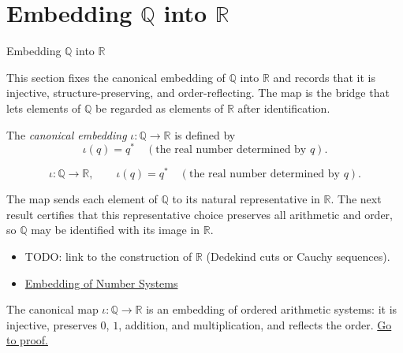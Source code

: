 \section{Embedding $\mathbb{Q}$ into $\mathbb{R}$}
\label{sec:embedding-q-into-r}

\begin{topicbox}{Embedding $\mathbb{Q}$ into $\mathbb{R}$}
\begin{exposition}
This section fixes the canonical embedding of $\mathbb{Q}$ into $\mathbb{R}$ and records that it is injective, structure-preserving, and order-reflecting. The map is the bridge that lets elements of $\mathbb{Q}$ be regarded as elements of $\mathbb{R}$ after identification.
\end{exposition}
\end{topicbox}
\begin{tcolorbox}[colback=defbox, colframe=defborder, arc=2pt,
  left=6pt, right=6pt, top=4pt, bottom=4pt,
  title={\small\textbf{Definition (Embedding $\mathbb{Q}$ into $\mathbb{R}$)}},
  fonttitle=\small\bfseries]
\begin{definition}
\label{def:embedding-q-into-r}
The \emph{canonical embedding} $\iota:\mathbb{Q}\to \mathbb{R}$ is defined by
\[
\iota(q)=q^{*} \quad(\text{the real number determined by } q).
\]
\end{definition}
\end{tcolorbox}
\begin{remark*}
\[
\iota:\mathbb{Q}\to \mathbb{R},\qquad \iota(q)=q^{*} \quad(\text{the real number determined by } q).
\]
\end{remark*}
\begin{remark*}[Interpretation]
The map sends each element of $\mathbb{Q}$ to its natural representative in $\mathbb{R}$. The next result certifies that this representative choice preserves all arithmetic and order, so $\mathbb{Q}$ may be identified with its image in $\mathbb{R}$.
\end{remark*}
\begin{dependencies}
\begin{itemize}
  \item TODO: link to the construction of $\mathbb{R}$ (Dedekind cuts or Cauchy sequences).
  \item \hyperref[def:number-system-embedding]{Embedding of Number Systems}
\end{itemize}
\end{dependencies}
\begin{tcolorbox}[colback=thmbox, colframe=thmborder, arc=2pt,
  left=6pt, right=6pt, top=4pt, bottom=4pt,
  title={\small\textbf{Theorem ($\mathbb{Q}$ Embeds in $\mathbb{R}$)}},
  fonttitle=\small\bfseries]
\begin{theorem}
\label{thm:q-embeds-in-r}
The canonical map $\iota:\mathbb{Q}\to \mathbb{R}$ is an embedding of ordered arithmetic systems: it is injective, preserves $0$, $1$, addition, and multiplication, and reflects the order.
\hyperref[prf:q-embeds-in-r]{Go to proof.}
\end{theorem}
\end{tcolorbox}
